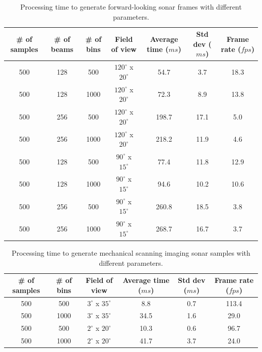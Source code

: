\documentclass[final,5p,times]{elsarticle}
\begin{document}
\begin{table}[t]
    \caption{Processing time to generate forward-looking sonar frames with different parameters.}
    \captionsetup{justification=justified}
    \label{table:fls}
    \begin{center}
        \begin{tabular}{| c | c | c | c | c | c | c |}
            \hline
            \# of samples & \# of beams & \# of bins & Field of view & Average time ($ms$) & Std dev ($ms$) & Frame rate ($fps$) \\
            \hline
            500     & 128     & 500       & $120^{\circ}$ x $20^{\circ}$        & 54.7    & 3.7   & 18.3 \\ \hline
            500     & 128     & 1000      & $120^{\circ}$ x $20^{\circ}$        & 72.3	& 8.9   & 13.8 \\ \hline
            500     & 256     & 500       & $120^{\circ}$ x $20^{\circ}$        & 198.7	& 17.1  & 5.0  \\ \hline
            500     & 256     & 1000      & $120^{\circ}$ x $20^{\circ}$        & 218.2	& 11.9  & 4.6  \\ \hline
            500     & 128     & 500       & $90^{\circ}$ x $15^{\circ}$         & 77.4	& 11.8  & 12.9 \\ \hline
            500     & 128     & 1000      & $90^{\circ}$ x $15^{\circ}$         & 94.6	& 10.2  & 10.6 \\ \hline
            500     & 256     & 500       & $90^{\circ}$ x $15^{\circ}$         & 260.8	& 18.5  & 3.8  \\ \hline
            500     & 256     & 1000      & $90^{\circ}$ x $15^{\circ}$         & 268.7	& 16.7  & 3.7  \\ \hline
        \end{tabular}
    \end{center}
\end{table}

\begin{table}
    \caption{Processing time to generate mechanical scanning imaging sonar samples with different parameters.}
    \captionsetup{justification=justified}
    \label{table:msis}
    \begin{center}
        \begin{tabular}{| c | c | c | c | c | c |}
            \hline
            \# of samples & \# of bins & Field of view & Average time ($ms$) & Std dev ($ms$) & Frame rate ($fps$) \\
            \hline
            500     & 500       & $3^{\circ}$ x $35^{\circ}$        & 8.8	    & 0.7  & 113.4 \\ \hline
            500     & 1000      & $3^{\circ}$ x $35^{\circ}$        & 34.5	& 1.6  & 29.0  \\ \hline
            500     & 500       & $2^{\circ}$ x $20^{\circ}$        & 10.3	& 0.6  & 96.7  \\ \hline
            500     & 1000      & $2^{\circ}$ x $20^{\circ}$        & 41.7	& 3.7  & 24.0  \\ \hline
        \end{tabular}
    \end{center}
\end{table}
\end{document}
